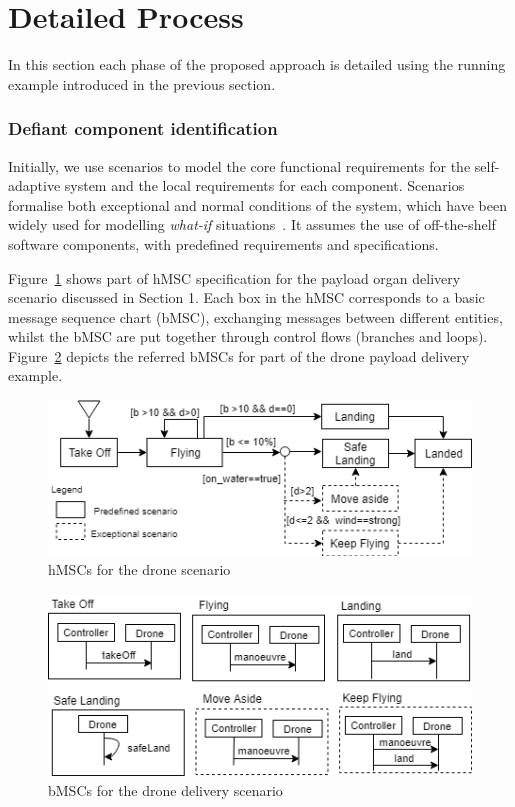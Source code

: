 \section{Detailed Process}

In this section each phase of the proposed approach is detailed using the running example introduced in the previous section.

\subsubsection{Defiant component identification}

Initially, we use scenarios to model the core functional requirements for the self-adaptive system and the local requirements for each component. Scenarios formalise both exceptional and normal conditions of the system, which have been widely used for modelling {\it what-if} situations~\cite{Uchitel2003}. It assumes the use of off-the-shelf software components, with predefined requirements and specifications. 

Figure~\ref{fig:drone_msc} shows part of hMSC specification for the payload organ delivery scenario discussed in Section 1. Each box in the hMSC corresponds to a basic message sequence chart (bMSC), exchanging messages between different entities, whilst the bMSC are put together through control flows (branches and loops). Figure~\ref{fig:drone_bmsc} depicts the referred bMSCs for part of the drone payload delivery example.

\begin{figure}
    \includegraphics[width=\columnwidth]{figures/new_drone_msc.png}
    \caption{hMSCs for the drone scenario}
    \label{fig:drone_msc}
    \vspace*{-0.25cm}
\end{figure}

\begin{figure}
    \includegraphics[width=\columnwidth]{figures/new_drone_bmsc.png}
    \caption{bMSCs for the drone delivery scenario}
    \label{fig:drone_bmsc}
    \vspace*{-0.5cm}
\end{figure}

